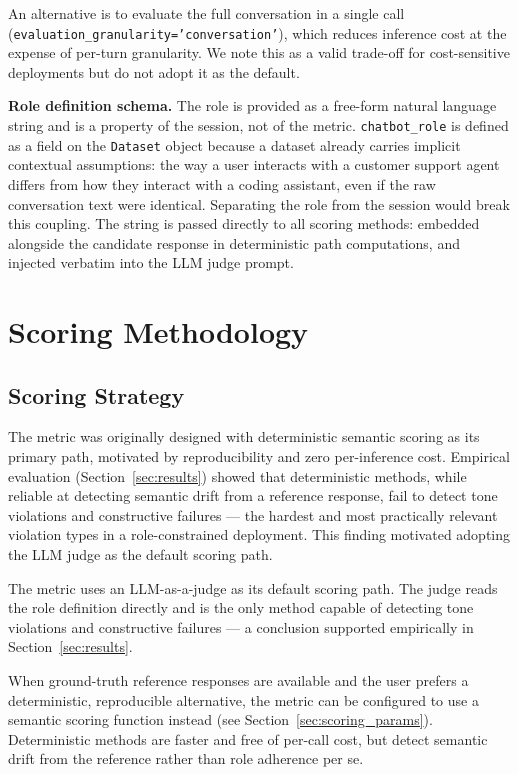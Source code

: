 \documentclass[11pt,a4paper]{article}
\begin{document}
An alternative is to evaluate the full conversation in a single call
(\texttt{evaluation\_granularity='conversation'}), which reduces inference
cost at the expense of per-turn granularity. We note this as a valid
trade-off for cost-sensitive deployments but do not adopt it as the default.

\textbf{Role definition schema.} The role is provided as a free-form natural
language string and is a property of the session, not of the metric.
\texttt{chatbot\_role} is defined as a field on the \texttt{Dataset} object
because a dataset already carries implicit contextual assumptions: the way a
user interacts with a customer support agent differs from how they interact
with a coding assistant, even if the raw conversation text were identical.
Separating the role from the session would break this coupling. The string is
passed directly to all scoring methods: embedded alongside the candidate
response in deterministic path computations, and injected verbatim into the
LLM judge prompt.

\section{Scoring Methodology}
\label{sec:scoring}

\subsection{Scoring Strategy}

The metric was originally designed with deterministic semantic scoring as
its primary path, motivated by reproducibility and zero per-inference cost.
Empirical evaluation (Section~\ref{sec:results}) showed that deterministic
methods, while reliable at detecting semantic drift from a reference
response, fail to detect tone violations and constructive failures --- the
hardest and most practically relevant violation types in a role-constrained
deployment. This finding motivated adopting the LLM judge as the default
scoring path.

The metric uses an LLM-as-a-judge as its default scoring path. The judge
reads the role definition directly and is the only method capable of
detecting tone violations and constructive failures --- a conclusion
supported empirically in Section~\ref{sec:results}.

When ground-truth reference responses are available and the user prefers
a deterministic, reproducible alternative, the metric can be configured
to use a semantic scoring function instead (see Section~\ref{sec:scoring_params}).
Deterministic methods are faster and free of per-call cost, but detect
semantic drift from the reference rather than role adherence per se.
\end{document}
